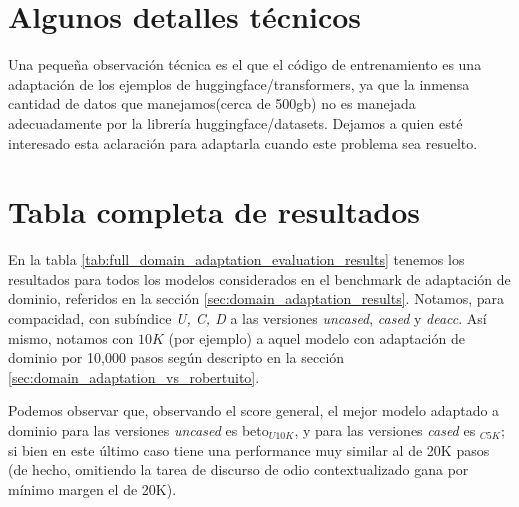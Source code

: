 
\section{Algunos detalles técnicos}

Una pequeña observación técnica es el que el código de entrenamiento es una adaptación de los ejemplos de huggingface/transformers, ya que la inmensa cantidad de datos que manejamos(cerca de 500gb) no es manejada adecuadamente por la librería huggingface/datasets. Dejamos a quien esté interesado esta aclaración para adaptarla cuando este problema sea resuelto.

\section{Tabla completa de resultados}



En la tabla \ref{tab:full_domain_adaptation_evaluation_results} tenemos los resultados para todos los modelos considerados en el benchmark de adaptación de dominio, referidos en la sección \ref{sec:domain_adaptation_results}. Notamos, para compacidad, con subíndice \emph{U, C, D} a las versiones  \emph{uncased}, \emph{cased} y \emph{deacc}. Así mismo, notamos con $10K$ (por ejemplo) a aquel modelo con adaptación de dominio por 10,000 pasos según descripto en la sección \ref{sec:domain_adaptation_vs_robertuito}.

Podemos observar que, observando el score general, el mejor modelo adaptado a dominio para las versiones \emph{uncased} es beto$_{U10K}$, y para las versiones \emph{cased} es \beto{}$_{C5K}$; si bien en este último caso tiene una performance muy similar al de 20K pasos (de hecho, omitiendo la tarea de discurso de odio contextualizado gana por mínimo margen el de 20K).

